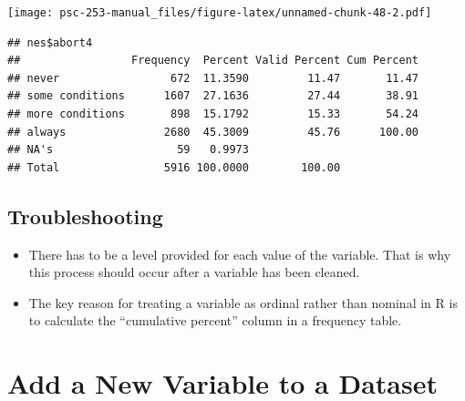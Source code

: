 \documentclass[
]{book}
\newenvironment{Shaded}{\begin{snugshade}}{\end{snugshade}}
\newcommand{\CommentTok}[1]{\textcolor[rgb]{0.56,0.35,0.01}{\textit{#1}}}
\newcommand{\FunctionTok}[1]{\textcolor[rgb]{0.00,0.00,0.00}{#1}}
\newcommand{\NormalTok}[1]{#1}
\newcommand{\OtherTok}[1]{\textcolor[rgb]{0.56,0.35,0.01}{#1}}
\newcommand{\SpecialCharTok}[1]{\textcolor[rgb]{0.00,0.00,0.00}{#1}}
\newcommand{\StringTok}[1]{\textcolor[rgb]{0.31,0.60,0.02}{#1}}
\providecommand{\tightlist}{%
  \setlength{\itemsep}{0pt}\setlength{\parskip}{0pt}}
\begin{document}
\begin{Shaded}
\end{Shaded}

\texttt{[image: psc-253-manual\_files/figure-latex/unnamed-chunk-48-2.pdf]}

\begin{verbatim}
## nes$abort4 
##                 Frequency  Percent Valid Percent Cum Percent
## never                 672  11.3590         11.47       11.47
## some conditions      1607  27.1636         27.44       38.91
## more conditions       898  15.1792         15.33       54.24
## always               2680  45.3009         45.76      100.00
## NA's                   59   0.9973                          
## Total                5916 100.0000        100.00
\end{verbatim}

\hypertarget{troubleshooting-16}{%
\subsection{Troubleshooting}\label{troubleshooting-16}}

\begin{itemize}
\tightlist
\item
  There has to be a level provided for each value of the variable. That is why this process should occur after a variable has been cleaned.
\item
  The key reason for treating a variable as ordinal rather than nominal in R is to calculate the ``cumulative percent'' column in a frequency table.
\end{itemize}

\hypertarget{add_variable}{%
\section{Add a New Variable to a Dataset}\label{add_variable}}
\end{document}

